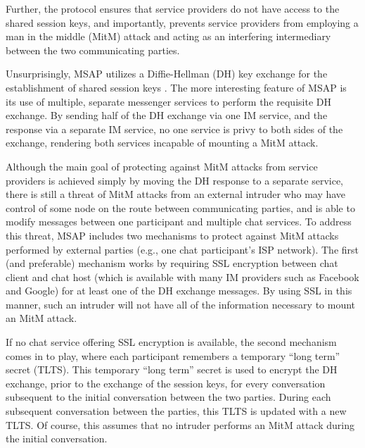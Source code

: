 \documentclass[twoside,10pt]{article}
\begin{document}
\begin{multicols}{2}
Further, the protocol ensures that service providers do not have access to the shared session keys, and importantly, prevents service providers from employing a man in the middle (MitM) attack and acting as an interfering intermediary between the two communicating parties.

Unsurprisingly, MSAP utilizes a Diffie-Hellman (DH) key exchange for the establishment of shared session keys \cite{diffie1976new}.  The more interesting feature of MSAP is its use of multiple, separate messenger services to perform the requisite DH exchange.  By sending half of the DH exchange via one IM service, and the response via a separate IM service, no one service is privy to both sides of the exchange, rendering both services incapable of mounting a MitM attack.

Although the main goal of protecting against MitM attacks from service providers is achieved simply by moving the DH response to a separate service, there is still a threat of MitM attacks from an external intruder who may have control of some node on the route between communicating parties, and is able to modify messages between one participant and multiple chat services. To address this threat, MSAP includes two mechanisms to protect against MitM attacks performed by external parties (e.g., one chat participant's ISP network).  The first (and preferable) mechanism works by requiring SSL encryption between chat client and chat host (which is available with many IM providers such as Facebook and Google) for at least one of the DH exchange messages.  By using SSL in this manner, such an intruder will not have all of the information necessary to mount an MitM attack.

If no chat service offering SSL encryption is available, the second mechanism comes in to play, where each participant remembers a temporary ``long term'' secret (TLTS).  This temporary ``long term'' secret is used to encrypt the DH exchange, prior to the exchange of the session keys, for every conversation subsequent to the initial conversation between the two parties.  During each subsequent conversation between the parties, this TLTS is updated with a new TLTS.  Of course, this assumes that no intruder performs an MitM attack during the initial conversation.


\end{multicols}
\end{document}
